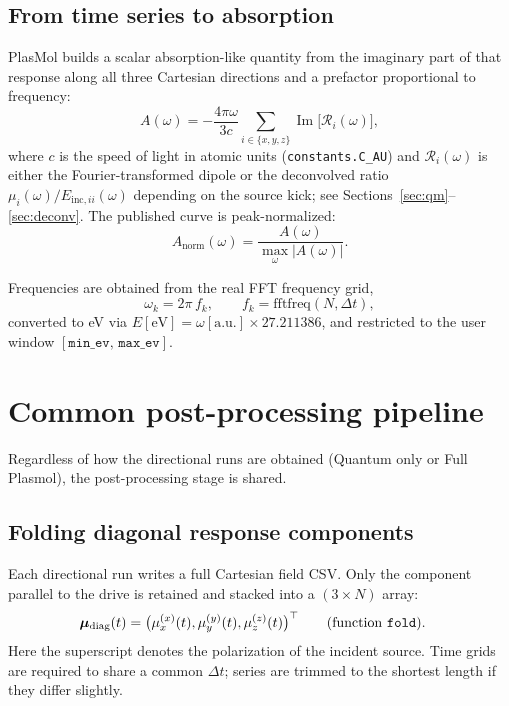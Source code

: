 \documentclass[11pt,a4paper]{article}
\begin{document}
\subsection{From time series to absorption}

PlasMol builds a scalar absorption-like quantity from the imaginary part of that response
along all three Cartesian directions and a prefactor proportional to frequency:
\begin{equation}
  A(\omega)
  =
  -\frac{4\pi\omega}{3c}
  \sum_{i\in\{x,y,z\}}
  \operatorname{Im}\!\big[\mathcal{R}_i(\omega)\big],
  \label{eq:abs}
\end{equation}
where $c$ is the speed of light in atomic units
(\texttt{constants.C\_AU}) and $\mathcal{R}_i(\omega)$ is either the
Fourier-transformed dipole or the deconvolved ratio
$\mu_i(\omega)/E_{\mathrm{inc},ii}(\omega)$ depending on the source kick; see
Sections~\ref{sec:qm}--\ref{sec:deconv}.  The published curve is
peak-normalized:
\begin{equation}
  A_{\mathrm{norm}}(\omega)
  =
  \frac{A(\omega)}{\max_\omega |A(\omega)|}.
\end{equation}

\noindent Frequencies are obtained from the real FFT frequency grid,
\begin{equation}
  \omega_k = 2\pi\, f_k,
  \qquad
  f_k = \mathrm{fftfreq}(N,\Delta t),
\end{equation}
converted to eV via $E[\mathrm{eV}] = \omega[\mathrm{a.u.}] \times 27.211386$,
and restricted to the user window
$[\texttt{min\_ev},\,\texttt{max\_ev}]$.

\section{Common post-processing pipeline}
\label{sec:common}

Regardless of how the directional runs are obtained (Quantum only or Full Plasmol), the post-processing
stage is shared.

\subsection{Folding diagonal response components}

Each directional run writes a full Cartesian field CSV.  Only the component
parallel to the drive is retained and stacked into a $(3\times N)$ array:
\begin{align}
  \boldsymbol{\mu}_{\mathrm{diag}}(t)
  &=
  \big(
    \mu_x^{(x)}(t),
    \mu_y^{(y)}(t),
    \mu_z^{(z)}(t)
  \big)^\top
  \qquad\text{(function \texttt{fold})}.
\end{align}
Here the superscript denotes the polarization of the incident source.  Time
grids are required to share a common $\Delta t$; series are trimmed to the
shortest length if they differ slightly.
\end{document}
